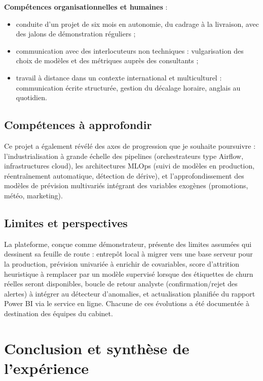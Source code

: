 \documentclass[12pt,a4paper]{report}
\begin{document}
\textbf{Compétences organisationnelles et humaines} :
\begin{itemize}
  \item conduite d'un projet de six mois en autonomie, du cadrage à la
    livraison, avec des jalons de démonstration réguliers ;
  \item communication avec des interlocuteurs non techniques : vulgarisation
    des choix de modèles et des métriques auprès des consultants ;
  \item travail à distance dans un contexte international et multiculturel :
    communication écrite structurée, gestion du décalage horaire, anglais au
    quotidien.
\end{itemize}

\section{Compétences à approfondir}

Ce projet a également révélé des axes de progression que je souhaite
poursuivre : l'industrialisation à grande échelle des pipelines
(orchestrateurs type Airflow, infrastructures cloud), les architectures MLOps
(suivi de modèles en production, réentraînement automatique, détection de
dérive), et l'approfondissement des modèles de prévision multivariés intégrant
des variables exogènes (promotions, météo, marketing).

\section{Limites et perspectives}

La plateforme, conçue comme démonstrateur, présente des limites assumées qui
dessinent sa feuille de route : entrepôt local à migrer vers une base
serveur pour la production, prévision univariée à enrichir de covariables,
score d'attrition heuristique à remplacer par un modèle supervisé lorsque des
étiquettes de churn réelles seront disponibles, boucle de retour analyste
(confirmation/rejet des alertes) à intégrer au détecteur d'anomalies, et
actualisation planifiée du rapport Power BI via le service en ligne. Chacune
de ces évolutions a été documentée à destination des équipes du cabinet.

\chapter{Conclusion et synthèse de l'expérience}
\end{document}
